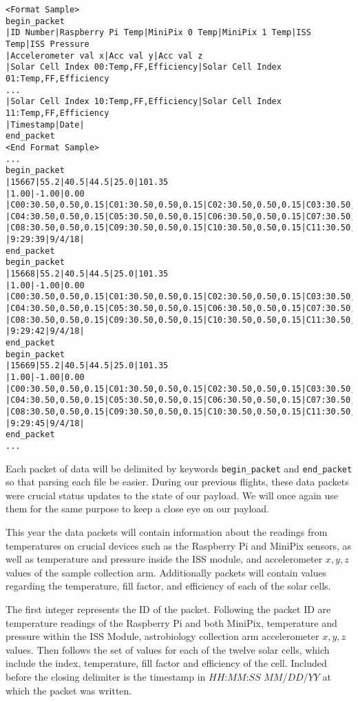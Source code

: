 \lstset{basicstyle=\small, numbers=left, xleftmargin=2em, frame=tb, label = Downlinks, framexleftmargin=1.5em}
\begin{lstlisting}[caption = Sample of proposed downlink data packets ID: 15667 - 15669]
<Format Sample>
begin_packet
|ID Number|Raspberry Pi Temp|MiniPix 0 Temp|MiniPix 1 Temp|ISS Temp|ISS Pressure
|Accelerometer val x|Acc val y|Acc val z
|Solar Cell Index 00:Temp,FF,Efficiency|Solar Cell Index 01:Temp,FF,Efficiency
...
|Solar Cell Index 10:Temp,FF,Efficiency|Solar Cell Index 11:Temp,FF,Efficiency
|Timestamp|Date|
end_packet
<End Format Sample>
...
begin_packet
|15667|55.2|40.5|44.5|25.0|101.35
|1.00|-1.00|0.00
|C00:30.50,0.50,0.15|C01:30.50,0.50,0.15|C02:30.50,0.50,0.15|C03:30.50,0.50,0.15
|C04:30.50,0.50,0.15|C05:30.50,0.50,0.15|C06:30.50,0.50,0.15|C07:30.50,0.50,0.15
|C08:30.50,0.50,0.15|C09:30.50,0.50,0.15|C10:30.50,0.50,0.15|C11:30.50,0.50,0.15
|9:29:39|9/4/18|
end_packet
begin_packet
|15668|55.2|40.5|44.5|25.0|101.35
|1.00|-1.00|0.00
|C00:30.50,0.50,0.15|C01:30.50,0.50,0.15|C02:30.50,0.50,0.15|C03:30.50,0.50,0.15
|C04:30.50,0.50,0.15|C05:30.50,0.50,0.15|C06:30.50,0.50,0.15|C07:30.50,0.50,0.15
|C08:30.50,0.50,0.15|C09:30.50,0.50,0.15|C10:30.50,0.50,0.15|C11:30.50,0.50,0.15
|9:29:42|9/4/18|
end_packet
begin_packet
|15669|55.2|40.5|44.5|25.0|101.35
|1.00|-1.00|0.00
|C00:30.50,0.50,0.15|C01:30.50,0.50,0.15|C02:30.50,0.50,0.15|C03:30.50,0.50,0.15
|C04:30.50,0.50,0.15|C05:30.50,0.50,0.15|C06:30.50,0.50,0.15|C07:30.50,0.50,0.15
|C08:30.50,0.50,0.15|C09:30.50,0.50,0.15|C10:30.50,0.50,0.15|C11:30.50,0.50,0.15
|9:29:45|9/4/18|
end_packet
...
\end{lstlisting}
\medskip

Each packet of data will be delimited by keywords \verb|begin_packet| and \verb|end_packet| so that parsing each file be easier.  During our previous flights, these data packets were crucial status updates to the state of our payload.  We will once again use them for the same purpose to keep a close eye on our payload.

This year the data packets will contain information about the readings from temperatures on crucial devices such as the Raspberry Pi and MiniPix sensors, as well as temperature and pressure inside the ISS module, and accelerometer $x, y, z$ values of the sample collection arm. Additionally packets will contain values regarding the temperature, fill factor, and efficiency of each of the solar cells.  

The first integer represents the ID of the packet.  Following the packet ID are temperature readings of the Raspberry Pi and both MiniPix, temperature and pressure within the ISS Module, astrobiology collection arm accelerometer $x, y, z$ values. Then follows the set of values for each of the twelve solar cells, which include the index, temperature, fill factor and efficiency of the cell. Included before the closing delimiter is the timestamp in $HH$:$MM$:$SS$ $MM$/$DD$/$YY$ at which the packet was written.  



